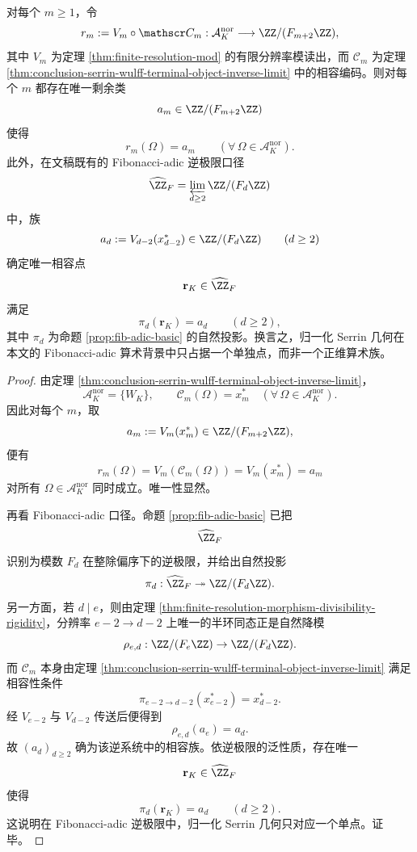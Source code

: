 \begin{theorem}\label{thm:conclusion-serrin-wulff-fibadic-single-point}
对每个 \(m\ge 1\)，令
\[
r_m:=V_m\circ \mathscr C_m:\mathcal A_K^{\mathrm{nor}}\longrightarrow \ZZ/(F_{m+2}\ZZ),
\]
其中 \(V_m\) 为定理 \ref{thm:finite-resolution-mod} 的有限分辨率模读出，而 \(\mathscr C_m\) 为定理 \ref{thm:conclusion-serrin-wulff-terminal-object-inverse-limit} 中的相容编码。则对每个 \(m\) 都存在唯一剩余类
\[
a_m\in \ZZ/(F_{m+2}\ZZ)
\]
使得
\[
r_m(\Omega)=a_m
\qquad
(\forall\,\Omega\in\mathcal A_K^{\mathrm{nor}}).
\]
此外，在文稿既有的 Fibonacci-adic 逆极限口径
\[
\widehat{\ZZ}_F=\varprojlim_{d\ge 2}\ZZ/(F_d\ZZ)
\]
中，族
\[
a_d:=V_{d-2}(x_{d-2}^\ast)\in \ZZ/(F_d\ZZ)
\qquad(d\ge 2)
\]
确定唯一相容点
\[
\mathbf r_K\in \widehat{\ZZ}_F
\]
满足
\[
\pi_d(\mathbf r_K)=a_d
\qquad(d\ge 2),
\]
其中 \(\pi_d\) 为命题 \ref{prop:fib-adic-basic} 的自然投影。换言之，归一化 Serrin 几何在本文的 Fibonacci-adic 算术背景中只占据一个单独点，而非一个正维算术族。
\end{theorem}
\begin{proof}
由定理 \ref{thm:conclusion-serrin-wulff-terminal-object-inverse-limit}，
\[
\mathcal A_K^{\mathrm{nor}}=\{W_K\},
\qquad
\mathscr C_m(\Omega)=x_m^\ast
\quad
(\forall\,\Omega\in\mathcal A_K^{\mathrm{nor}}).
\]
因此对每个 \(m\)，取
\[
a_m:=V_m(x_m^\ast)\in\ZZ/(F_{m+2}\ZZ),
\]
便有
\[
r_m(\Omega)=V_m(\mathscr C_m(\Omega))=V_m(x_m^\ast)=a_m
\]
对所有 \(\Omega\in\mathcal A_K^{\mathrm{nor}}\) 同时成立。唯一性显然。

再看 Fibonacci-adic 口径。命题 \ref{prop:fib-adic-basic} 已把
\[
\widehat{\ZZ}_F
\]
识别为模数 \(F_d\) 在整除偏序下的逆极限，并给出自然投影
\[
\pi_d:\widehat{\ZZ}_F\twoheadrightarrow \ZZ/(F_d\ZZ).
\]
另一方面，若 \(d\mid e\)，则由定理 \ref{thm:finite-resolution-morphism-divisibility-rigidity}，分辨率 \(e-2\to d-2\) 上唯一的半环同态正是自然降模
\[
\rho_{e,d}:\ZZ/(F_e\ZZ)\to \ZZ/(F_d\ZZ).
\]
而 \(\mathscr C_m\) 本身由定理 \ref{thm:conclusion-serrin-wulff-terminal-object-inverse-limit} 满足相容性条件
\[
\pi_{e-2\to d-2}(x_{e-2}^\ast)=x_{d-2}^\ast.
\]
经 \(V_{e-2}\) 与 \(V_{d-2}\) 传送后便得到
\[
\rho_{e,d}(a_e)=a_d.
\]
故 \((a_d)_{d\ge 2}\) 确为该逆系统中的相容族。依逆极限的泛性质，存在唯一
\[
\mathbf r_K\in \widehat{\ZZ}_F
\]
使得
\[
\pi_d(\mathbf r_K)=a_d\qquad(d\ge 2).
\]
这说明在 Fibonacci-adic 逆极限中，归一化 Serrin 几何只对应一个单点。证毕。
\end{proof}

\endinput
